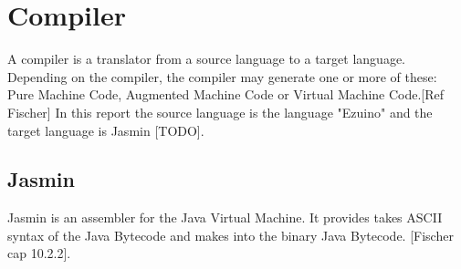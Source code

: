 \section{Compiler}
A compiler is a translator from a source language to a target language.
Depending on the compiler, the compiler may generate one or more of these: Pure Machine Code, Augmented Machine Code or Virtual Machine Code.[Ref Fischer]
In this report the source language is the language "Ezuino" and the target language is Jasmin [TODO].

\subsection{Jasmin}
Jasmin is an assembler for the Java Virtual Machine. It provides takes ASCII syntax of the Java Bytecode and makes into the binary Java Bytecode. [Fischer cap 10.2.2]. 
